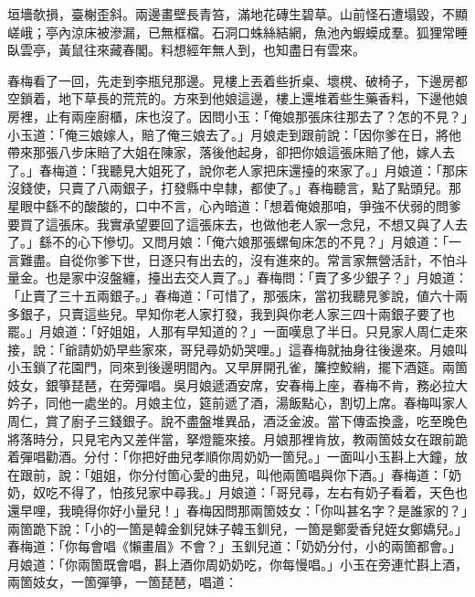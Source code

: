 \begin{myquote}
垣墻欹損，臺榭歪斜。兩邊畫壁長青笞，滿地花磚生碧草。山前怪石遭塌毀，不顯嵯峨；亭內涼床被滲漏，已無框檔。石洞口蛛絲結網，魚池內蝦蟆成羣。狐狸常睡臥雲亭，黃鼠往來藏春閣。料想經年無人到，也知盡日有雲來。
\end{myquote}

春梅看了一回，先走到李瓶兒那邊。見樓上丟着些折桌、壞櫈、破椅子，下邊房都空鎖着，地下草長的荒荒的。{}方來到他娘這邊，樓上還堆着些生藥香料，下邊他娘房裡，止有兩座廚櫃，床也沒了。因問小玉：「俺娘那張床往那去了？怎的不見？」小玉道：「俺三娘嫁人，賠了俺三娘去了。」月娘走到跟前說：「因你爹在日，將他帶來那張八步床賠了大姐在陳家，落後他起身，卻把你娘這張床賠了他，嫁人去了。」春梅道：「我聽見大姐死了，說你老人家把床還擡的來家了。」月娘道：「那床沒錢使，只賣了八兩銀子，打發縣中皁隸，都使了。」春梅聽言，點了點頭兒。那星眼中繇不的酸酸的，口中不言，心內暗道：「想着俺娘那咱，爭強不伏弱的問爹要買了這張床。我實承望要回了這張床去，也做他老人家一念兒，不想又與了人去了。」繇不的心下慘切。{}又問月娘：「俺六娘那張螺甸床怎的不見？」月娘道：「一言難盡。自從你爹下世，日逐只有出去的，沒有進來的。常言家無營活計，不怕斗量金。也是家中沒盤纏，擡出去交人賣了。」春梅問：「賣了多少銀子？」月娘道：「止賣了三十五兩銀子。」春梅道：「可惜了，那張床，當初我聽見爹說，値六十兩多銀子，只賣這些兒。早知你老人家打發，我到與你老人家三四十兩銀子要了也罷。」月娘道：「好姐姐，人那有早知道的？」一面嘆息了半日。只見家人周仁走來接，說：「爺請奶奶早些家來，哥兒尋奶奶哭哩。」這春梅就抽身往後邊來。月娘叫小玉鎖了花園門，同來到後邊明間內。又早屏開孔雀，簾控鮫綃，擺下酒筵。兩箇妓女，銀箏琵琶，在旁彈唱。吳月娘遞酒安席，安春梅上座，{}春梅不肯，務必拉大妗子，同他一處坐的。月娘主位，筵前遞了酒，湯飯點心，割切上席。春梅叫家人周仁，賞了廚子三錢銀子。說不盡盤堆異品，酒泛金波。當下傳盃換盞，吃至晚色將落時分，只見宅內又差伴當，拏燈籠來接。月娘那裡肯放，教兩箇妓女在跟前跪着彈唱勸酒。分付：「你把好曲兒孝順你周奶奶一箇兒。」一面叫小玉斟上大鐘，放在跟前，說：「姐姐，你分付箇心愛的曲兒，叫他兩箇唱與你下酒。」春梅道：「奶奶，奴吃不得了，怕孩兒家中尋我。」月娘道：「哥兒尋，左右有奶子看着，天色也還早哩，我曉得你好小量兒！」春梅因問那兩箇妓女：「你叫甚名字？是誰家的？」兩箇跪下說：「小的一箇是韓金釧兒妹子韓玉釧兒，一箇是鄭愛香兒姪女鄭嬌兒。」春梅道：「你每會唱《懶畫眉》不會？」玉釧兒道：「奶奶分付，小的兩箇都會。」月娘道：「你兩箇既會唱，斟上酒你周奶奶吃，你每慢唱。」小玉在旁連忙斟上酒，兩箇妓女，一箇彈箏，一箇琵琶，唱道：

